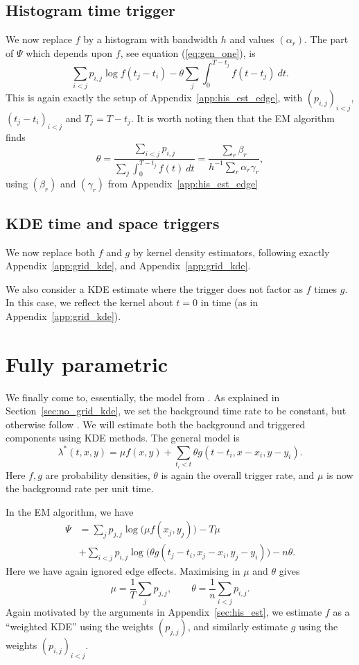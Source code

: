 \documentclass[twoside,a4paper]{article}
\theoremstyle{plain}
\theoremstyle{definition}
\begin{document}
\subsection{Histogram time trigger}\label{app:grid_space_hist_time}

We now replace $f$ by a histogram with bandwidth $h$ and values $(\alpha_r)$.
The part of $\Psi$ which depends upon $f$, see equation (\ref{eq:gen_one}), is
\[ \sum_{i<j} p_{i,j} \log f(t_j-t_i) - \theta \sum_j \int_0^{T-t_j} f(t-t_j) \ dt. \]
This is again exactly the setup of Appendix~\ref{app:his_est_edge}, with $(p_{i,j})_{i<j}$,
$(t_j-t_i)_{i<j}$ and $T_j = T-t_j$.  It is worth noting then that the EM algorithm finds
\[ \theta = \frac{\sum_{i<j} p_{i,j}}{\sum_j \int_0^{T-t_j} f(t) \ dt}
= \frac{\sum_r \beta_r}{h^{-1} \sum_r \alpha_r \gamma_r}, \]
using $(\beta_r)$ and $(\gamma_r)$ from Appendix~\ref{app:his_est_edge}


\subsection{KDE time and space triggers}

We now replace both $f$ and $g$ by kernel density estimators, following exactly
Appendix~\ref{app:grid_kde}, and Appendix~\ref{app:grid_kde}.

We also consider a KDE estimate where the trigger does not factor as $f$ times $g$.
In this case, we reflect the kernel about $t=0$ in time (as in Appendix~\ref{app:grid_kde}).




\section{Fully parametric}

We finally come to, essentially, the model from \cite{sepp2}.
As explained in Section~\ref{sec:no_grid_kde}, we set the background time rate to
be constant, but otherwise follow \cite{sepp2}.
We will estimate both the background and triggered components using KDE methods.
The general model is
\[ \lambda^*(t,x,y) = \mu f(x,y) + \sum_{t_i<t} \theta g(t-t_i, x-x_i, y-y_i). \]
Here $f,g$ are probability densities, $\theta$ is again the overall trigger rate,
and $\mu$ is now the background rate per unit time.

In the EM algorithm, we have
\begin{align*} \Psi &= \sum_j p_{j,j} \log\big(\mu f(x_j,y_j)\big) - T\mu \\
&+ \sum_{i<j} p_{i,j} \log\big( \theta g(t_j-t_i, x_j-x_i, y_j-y_i) \big) - n\theta.
\end{align*}
Here we have again ignored edge effects.
Maximising in $\mu$ and $\theta$ gives
\[ \mu = \frac{1}{T} \sum_j p_{j,j}, \qquad
\theta = \frac1n \sum_{i<j} p_{i,j}. \]
Again motivated by the arguments in Appendix~\ref{sec:his_est}, we estimate $f$ as a
``weighted KDE'' using the weights $(p_{j,j})$, and similarly estimate $g$ using the
weights $(p_{i,j})_{i<j}$.
\end{document}
